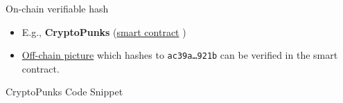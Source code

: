 \documentclass[]{beamer}
\begin{document}
\begin{frame}{On-chain verifiable hash}

	\begin{itemize}
		\item E.g., \textbf{CryptoPunks} (\href{https://etherscan.io/address/0xb47e3cd837ddf8e4c57f05d70ab865de6e193bbb}{\link smart contract} )
		\item  \href{https://www.larvalabs.com/public/images/cryptopunks/punks.png}{\link Off-chain picture} which hashes to \texttt{\scriptsize ac39a\dots 921b} can be verified in the smart contract.
	\end{itemize}
	\begin{samplecode}{CryptoPunks Code Snippet}
		
	\end{samplecode}
\end{frame}
\end{document}
